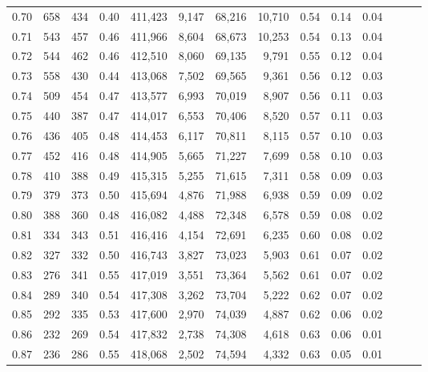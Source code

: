 \begin{tabular}{rrrrrrrrrrrrrr}
0.70 &     658 &    434 &  0.40 &  411,423 &    9,147 &  68,216 &  10,710 &  0.54 &  0.14 &      0.04 \\
0.71 &     543 &    457 &  0.46 &  411,966 &    8,604 &  68,673 &  10,253 &  0.54 &  0.13 &      0.04 \\
0.72 &     544 &    462 &  0.46 &  412,510 &    8,060 &  69,135 &   9,791 &  0.55 &  0.12 &      0.04 \\
0.73 &     558 &    430 &  0.44 &  413,068 &    7,502 &  69,565 &   9,361 &  0.56 &  0.12 &      0.03 \\
0.74 &     509 &    454 &  0.47 &  413,577 &    6,993 &  70,019 &   8,907 &  0.56 &  0.11 &      0.03 \\
0.75 &     440 &    387 &  0.47 &  414,017 &    6,553 &  70,406 &   8,520 &  0.57 &  0.11 &      0.03 \\
0.76 &     436 &    405 &  0.48 &  414,453 &    6,117 &  70,811 &   8,115 &  0.57 &  0.10 &      0.03 \\
0.77 &     452 &    416 &  0.48 &  414,905 &    5,665 &  71,227 &   7,699 &  0.58 &  0.10 &      0.03 \\
0.78 &     410 &    388 &  0.49 &  415,315 &    5,255 &  71,615 &   7,311 &  0.58 &  0.09 &      0.03 \\
0.79 &     379 &    373 &  0.50 &  415,694 &    4,876 &  71,988 &   6,938 &  0.59 &  0.09 &      0.02 \\
0.80 &     388 &    360 &  0.48 &  416,082 &    4,488 &  72,348 &   6,578 &  0.59 &  0.08 &      0.02 \\
0.81 &     334 &    343 &  0.51 &  416,416 &    4,154 &  72,691 &   6,235 &  0.60 &  0.08 &      0.02 \\
0.82 &     327 &    332 &  0.50 &  416,743 &    3,827 &  73,023 &   5,903 &  0.61 &  0.07 &      0.02 \\
0.83 &     276 &    341 &  0.55 &  417,019 &    3,551 &  73,364 &   5,562 &  0.61 &  0.07 &      0.02 \\
0.84 &     289 &    340 &  0.54 &  417,308 &    3,262 &  73,704 &   5,222 &  0.62 &  0.07 &      0.02 \\
0.85 &     292 &    335 &  0.53 &  417,600 &    2,970 &  74,039 &   4,887 &  0.62 &  0.06 &      0.02 \\
0.86 &     232 &    269 &  0.54 &  417,832 &    2,738 &  74,308 &   4,618 &  0.63 &  0.06 &      0.01 \\
0.87 &     236 &    286 &  0.55 &  418,068 &    2,502 &  74,594 &   4,332 &  0.63 &  0.05 &      0.01 \\

\end{tabular}
